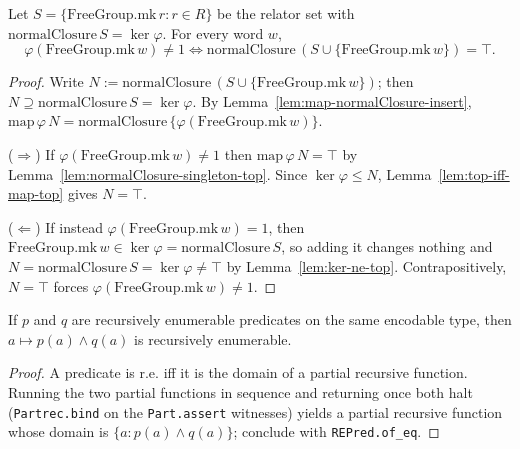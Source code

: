 \begin{lemma}
    \label{lem:collapse}
    Let $S = \{\mathrm{FreeGroup.mk}\,r : r \in R\}$ be the relator set with
    $\mathrm{normalClosure}\,S = \ker\varphi$. For every word $w$,
    \[
        \varphi(\mathrm{FreeGroup.mk}\,w) \neq 1
        \iff \mathrm{normalClosure}\,(S \cup \{\mathrm{FreeGroup.mk}\,w\}) = \top .
    \]
\end{lemma}
\begin{proof}
    Write $N := \mathrm{normalClosure}\,(S \cup \{\mathrm{FreeGroup.mk}\,w\})$;
    then $N \supseteq \mathrm{normalClosure}\,S = \ker\varphi$. By
    Lemma~\ref{lem:map-normalClosure-insert},
    $\mathrm{map}\,\varphi\,N =
    \mathrm{normalClosure}\,\{\varphi(\mathrm{FreeGroup.mk}\,w)\}$.

    ($\Rightarrow$) If $\varphi(\mathrm{FreeGroup.mk}\,w) \neq 1$ then
    $\mathrm{map}\,\varphi\,N = \top$ by
    Lemma~\ref{lem:normalClosure-singleton-top}. Since $\ker\varphi \le N$,
    Lemma~\ref{lem:top-iff-map-top} gives $N = \top$.

    ($\Leftarrow$) If instead $\varphi(\mathrm{FreeGroup.mk}\,w) = 1$, then
    $\mathrm{FreeGroup.mk}\,w \in \ker\varphi = \mathrm{normalClosure}\,S$, so
    adding it changes nothing and $N = \mathrm{normalClosure}\,S = \ker\varphi
    \neq \top$ by Lemma~\ref{lem:ker-ne-top}. Contrapositively, $N = \top$ forces
    $\varphi(\mathrm{FreeGroup.mk}\,w) \neq 1$.
\end{proof}

\begin{lemma}
    \label{lem:re-and}
    \leanok
    If $p$ and $q$ are recursively enumerable predicates on the same encodable
    type, then $a \mapsto p(a) \wedge q(a)$ is recursively enumerable.
\end{lemma}
\begin{proof}
    A predicate is r.e. iff it is the domain of a partial recursive function.
    Running the two partial functions in sequence and returning once both halt
    (\texttt{Partrec.bind} on the \texttt{Part.assert} witnesses) yields a partial
    recursive function whose domain is $\{a : p(a) \wedge q(a)\}$; conclude with
    \texttt{REPred.of\_eq}.
\end{proof}

